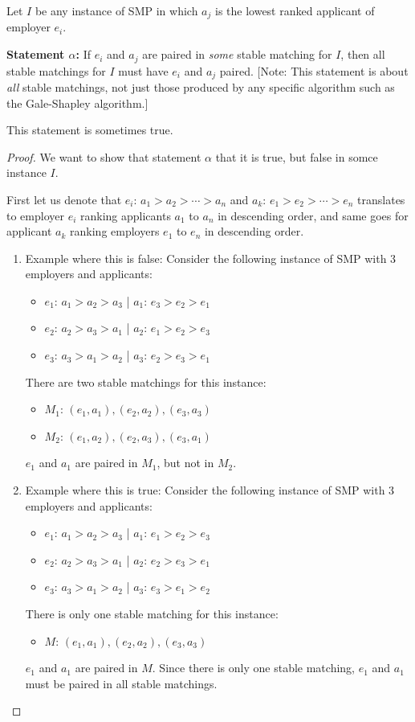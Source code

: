 \documentclass[11pt,fleqn]{exam}
\newenvironment{soln}{\color{solnblue}}{}
\begin{document}
\begin{questions}
\question[2]
  Let $I$ be any instance of SMP in which $a_j$ is the lowest ranked applicant of employer $e_i$. 

\noindent
{\bf Statement $\alpha$:} If $e_i$ and $a_j$ are paired in {\em some} stable matching for $I$, 
then all stable matchings for $I$ must have $e_i$ and $a_j$ paired. [Note: This statement 
is about {\em all} stable matchings, not just those produced by any specific algorithm such 
as the Gale-Shapley algorithm.]

\begin{soln}
	This statement is sometimes true.
	\begin{proof}
	We want to show that statement $\alpha$ that it is true, but false in somce instance $I$. 

	First let us denote that $e_i$: $a_1 > a_2 > \cdots > a_n$ and $a_k$: $e_1 > e_2 > \cdots > e_n$ 
	translates to employer $e_i$ ranking applicants $a_1$ to $a_n$ in descending order, 
	and same goes for applicant $a_k$ ranking employers $e_1$ to $e_n$ in descending order.
	
	\begin{enumerate}
		\item Example where this is false: Consider the following instance of SMP with 3 employers and applicants:
		\begin{itemize}
			\item $e_1$: $a_1 > a_2 > a_3$ | $a_1$: $e_3 > e_2 > e_1$
			\item $e_2$: $a_2 > a_3 > a_1$ | $a_2$: $e_1 > e_2 > e_3$
			\item $e_3$: $a_3 > a_1 > a_2$ | $a_3$: $e_2 > e_3 > e_1$
		\end{itemize}
		There are two stable matchings for this instance:
		\begin{itemize}
			\item $M_1$: $(e_1, a_1), (e_2, a_2), (e_3, a_3)$
			\item $M_2$: $(e_1, a_2), (e_2, a_3), (e_3, a_1)$
		\end{itemize}
		$e_1$ and $a_1$ are paired in $M_1$, but not in $M_2$.

		\item Example where this is true: Consider the following instance of SMP with 3 employers and applicants:
		\begin{itemize}
			\item $e_1$: $a_1 > a_2 > a_3$ | $a_1$: $e_1 > e_2 > e_3$
			\item $e_2$: $a_2 > a_3 > a_1$ | $a_2$: $e_2 > e_3 > e_1$
			\item $e_3$: $a_3 > a_1 > a_2$ | $a_3$: $e_3 > e_1 > e_2$
		\end{itemize}
		There is only one stable matching for this instance:
		\begin{itemize}
			\item $M$: $(e_1, a_1), (e_2, a_2), (e_3, a_3)$
		\end{itemize}
		$e_1$ and $a_1$ are paired in $M$. Since there is only one stable matching, $e_1$ and $a_1$ must be paired in all stable matchings.
	\end{enumerate}


\end{proof}
\end{soln}
\end{questions}
\end{document}

